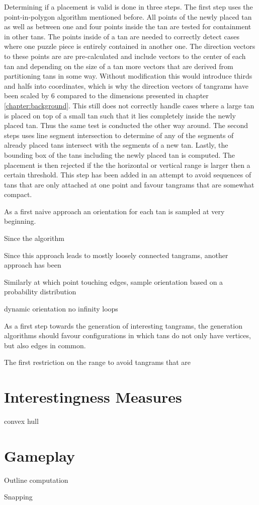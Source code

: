 Determining if a placement is valid is done in three steps. The first step uses the point-in-polygon algorithm mentioned before. All points of the newly placed tan as well as between one and four points inside the tan are tested for containment in other tans. The points inside of a tan are needed to correctly detect cases where one puzzle piece is entirely contained in another one. The direction vectors to these points are are pre-calculated and include vectors to the center of each tan and depending on the size of a tan more vectors that are derived from partitioning tans in some way. Without modification this would introduce thirds and halfs into coordinates, which is why the direction vectors of tangrams have been scaled by 6 compared to the dimensions presented in chapter \ref{chapter:background}. This still does not correctly handle cases where a large tan is placed on top of a small tan such that it lies completely inside the newly placed tan. Thus the same test is conducted the other way around. The second steps uses line segment intersection to determine of any of the segments of already placed tans intersect with the segments of a new tan.
Lastly, the bounding box of the tans including the newly placed tan is computed. The placement is then rejected if the the horizontal or vertical range is larger then a certain threshold. This step has been added in an attempt to avoid  sequences of tans that are only attached at one point and favour tangrams that are somewhat compact.

As a first naive approach an orientation for each tan is sampled at very beginning. 


Since the algorithm




Since this approach leads to mostly loosely connected tangrams, another approach has been 

Similarly 
at which point touching edges, sample orientation based on a probability distribution 

dynamic orientation no infinity loops 

As a first step towards the generation of interesting tangrams, the generation algorithms should favour configurations in which tans do not only have vertices, but also edges in common. 

The first  restriction on the range to avoid tangrams that are 

\section{Interestingness Measures}
\label{interesting}
convex hull

\section{Gameplay}
Outline computation \label{outline}

Snapping
